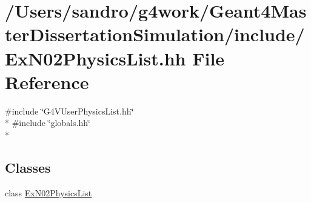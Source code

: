 \hypertarget{_ex_n02_physics_list_8hh}{\section{/\-Users/sandro/g4work/\-Geant4\-Master\-Dissertation\-Simulation/include/\-Ex\-N02\-Physics\-List.hh File Reference}
\label{_ex_n02_physics_list_8hh}
}
{\ttfamily \#include \char`\"{}G4\-V\-User\-Physics\-List.\-hh\char`\"{}}\\*
{\ttfamily \#include \char`\"{}globals.\-hh\char`\"{}}\\*
\subsection*{Classes}
\begin{DoxyCompactItemize}
\item 
class \hyperlink{class_ex_n02_physics_list}{Ex\-N02\-Physics\-List}
\end{DoxyCompactItemize}
